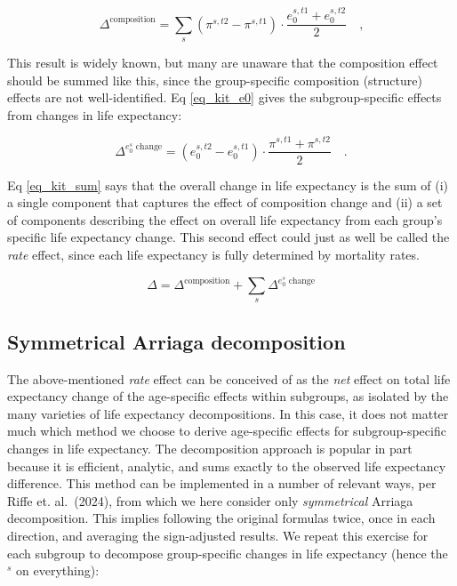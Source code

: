 \documentclass[sn-apa,pdflatex]{sn-jnl}
\theoremstyle{remark}
\theoremstyle{definition}
\begin{document}
\begin{equation}
\label{eq_kit_comp}
\Delta^\text{composition} = \sum_s \left(\pi^{s,t2}- \pi^{s,t1}\right) \cdot \frac{e_0^{s,t1} + e_0^{s,t2}}{2} \quad \textrm{,}
\end{equation}

This result is widely known, but many are unaware that the composition
effect should be summed like this, since the group-specific composition
(structure) effects are not well-identified. Eq \eqref{eq_kit_e0} gives
the subgroup-specific effects from changes in life expectancy:

\begin{equation}
\label{eq_kit_e0}
\Delta^{e_0^s\text{~change}} = \left(e_0^{s,t2} - e_0^{s,t1}\right) \cdot \frac{\pi^{s,t1} + \pi^{s,t2}}{2}\quad \textrm{.}
\end{equation}

Eq \eqref{eq_kit_sum} says that the overall change in life expectancy is
the sum of (i) a single component that captures the effect of
composition change and (ii) a set of components describing the effect on
overall life expectancy from each group's specific life expectancy
change. This second effect could just as well be called the \emph{rate}
effect, since each life expectancy is fully determined by mortality
rates.

\begin{equation}
\label{eq_kit_sum}
\Delta = \Delta^\text{composition}  + \sum_s \Delta^{e_0^s\text{~change}}
\end{equation}

\hypertarget{symmetrical-arriaga-decomposition}{%
\subsection{Symmetrical Arriaga
decomposition}\label{symmetrical-arriaga-decomposition}}

The above-mentioned \emph{rate} effect can be conceived of as the
\emph{net} effect on total life expectancy change of the age-specific
effects within subgroups, as isolated by the many varieties of life
expectancy decompositions. In this case, it does not matter much which
method we choose to derive age-specific effects for subgroup-specific
changes in life expectancy. The \citet{arriaga1984measuring}
decomposition approach is popular in part because it is efficient,
analytic, and sums exactly to the observed life expectancy difference.
This method can be implemented in a number of relevant ways, per Riffe
et. al.~(2024), from which we here consider only \emph{symmetrical}
Arriaga decomposition. This implies following the original formulas
twice, once in each direction, and averaging the sign-adjusted results.
We repeat this exercise for each subgroup to decompose group-specific
changes in life expectancy (hence the \(^s\) on everything):
\end{document}

